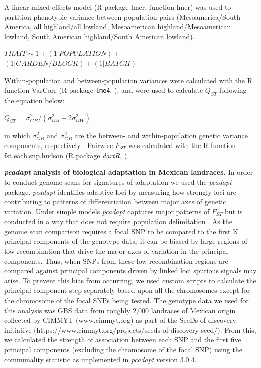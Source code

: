 \documentclass[9pt,twocolumn,twoside,lineno]{BioRxiv}
\begin{document}
A linear mixed effects model (R package lmer, function lmer) was used to partition phenotypic variance between population pairs (Mesoamerica/South America, all highland/all lowland, Mesoamerican highland/Mesoamerican lowland, South American highland/South American lowland).
\begin{center}
${ TRAIT \sim 1 + (1|POPULATION) + }$\\
${(1|GARDEN/BLOCK) + (1|BATCH)}$
\end{center}
Within-population and between-population variances were calculated with the R function VarCorr (R package \texttt{lme4}, \citealp{bates2014lme4}), and were used to calculate $Q_{ST}$ following the equation below:
\begin{center}
$Q_{ST}$ = \(\sigma^{2}_{GB}/(\sigma^{2}_{GB}+2\sigma^{2}_{GW})\)
\end{center}
\noindent in which $\sigma^{2}_{GB}$ and $\sigma^{2}_{GB}$ are the between- and within-population genetic variance components, respectively \cite{Leinonen2013-ic}.
Pairwise $F_{ST}$ was calculated with the R function fst.each.snp.hudson (R package \textit{dartR}, \citealp{gruber2018dartr}).

\textbf{\textit{pcadapt} analysis of biological adaptation in Mexican landraces.}
In order to conduct genome scans for signatures of adaptation we used the \textit{pcadapt} \cite{Luu2017-ws} package.
\textit{pcadapt} identifies adaptive loci by measuring how strongly loci are contributing to patterns of differentiation between major axes of genetic variation.
Under simple models \textit{pcadapt} captures major patterns of $F_{ST}$  but is conducted in a way that does not require population delimitation \cite{duforet2014genome}.
As the genome scan comparison requires a focal SNP to be compared to the first K principal components of the genotype data, it can be biased by large regions of low recombination that drive the major axes of variation in the principal components.
Thus, when SNPs from these low recombination regions are compared against principal components driven by linked loci spurious signals may arise.
To prevent this bias from occurring, we used custom scripts to calculate the principal component step separately based upon all the chromosomes except for the chromosome of the focal SNPs being tested.
The genotype data we used for this analysis was GBS data from roughly 2,000 landraces of Mexican origin collected by CIMMYT (www.cimmyt.org) as part of the SeeDs of discovery initiative (https://www.cimmyt.org/projects/seeds-of-discovery-seed/).
From this, we calculated the strength of association between each SNP and the first five principal components (excluding the chromosome of the focal SNP) using the communality statistic as implemented in \textit{pcadapt} version 3.0.4.
\end{document}
